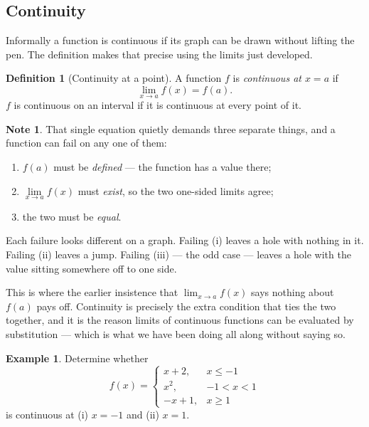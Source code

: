 \documentclass[11pt,a4paper]{article}
\theoremstyle{definition}
\newtheorem{definition}[thm]{Definition}
\newtheorem{example}[thm]{Example}
\newtheorem{note}[thm]{Note}
\begin{document}
\subsection{Continuity}
Informally a function is continuous if its graph can be drawn without lifting the
pen. The definition makes that precise using the limits just developed.

\begin{definition}[Continuity at a point]
A function $f$ is \emph{continuous at $x=a$} if
$$\lim_{x\to a}f(x)=f(a).$$
$f$ is continuous on an interval if it is continuous at every point of it.
\end{definition}

\begin{note}
That single equation quietly demands three separate things, and a function can
fail on any one of them:
\begin{enumerate}
\item[(i).] $f(a)$ must be \emph{defined} --- the function has a value there;
\item[(ii).] $\lim\limits_{x\to a}f(x)$ must \emph{exist}, so the two one-sided
limits agree;
\item[(iii).] the two must be \emph{equal}.
\end{enumerate}
Each failure looks different on a graph. Failing (i) leaves a hole with nothing in
it. Failing (ii) leaves a jump. Failing (iii) --- the odd case --- leaves a hole with
the value sitting somewhere off to one side.

This is where the earlier insistence that $\lim_{x\to a}f(x)$ says nothing about
$f(a)$ pays off. Continuity is precisely the extra condition that ties the two
together, and it is the reason limits of continuous functions can be evaluated by
substitution --- which is what we have been doing all along without saying so.
\end{note}

\begin{example}
Determine whether
$$f(x)=
\begin{cases}
x+2, & x\leq -1\\
x^{2}, & -1<x<1\\
-x+1, & x\geq 1
\end{cases}$$
is continuous at (i) $x=-1$ and (ii) $x=1$.
\end{example}
\end{document}
